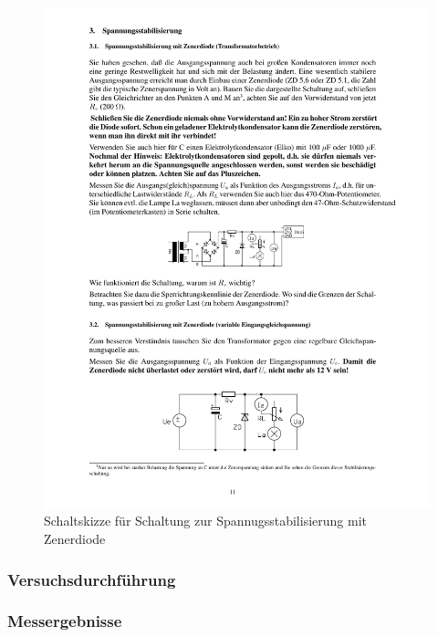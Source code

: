 \documentclass[12pt,a4paper]{article}
\begin{document}
\begin{figure}[H] 
  \centering
    \includegraphics[trim = 10mm 130mm 10mm 120mm, clip, scale = 1]{ep2_14[Page11].pdf}
  	\caption[Schaltskizze für Schaltung zur Spannugsstabilisierung mit Zenerdiode]{Schaltskizze für Schaltung zur Spannugsstabilisierung mit Zenerdiode\footnotemark}
  \label{fig:2_8}
\end{figure}

\subsubsection{Versuchsdurchführung}
\subsubsection{Messergebnisse}
\end{document}
